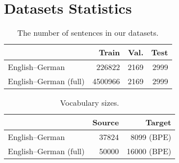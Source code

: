 \documentclass[11pt,a4paper]{article}
\begin{document}
\section{Datasets Statistics}
\label{sec:data-stats}
\begin{table}[bh]
\centering
\begin{tabular}{@{}lrrr@{}} 
\toprule
          & Train    & Val. & Test \\ 
\midrule
English--German & 226822 & 2169 & 2999 \\
English--German (full) & 4500966  & 2169 & 2999\\

\bottomrule
\end{tabular}
\caption{The number of sentences in our datasets.}
\label{tab:data}
\end{table}

\begin{table}[th]
\centering
\begin{tabular}{@{}lrr@{}} 
\toprule
           & Source    & Target \\ 
\midrule
English--German & 37824 & 8099 (BPE) \\
English--German (full)      & 50000 & 16000 (BPE) \\
\bottomrule
\end{tabular}
\caption{Vocabulary sizes.}
\label{tab:voc}
\end{table}
\end{document}
